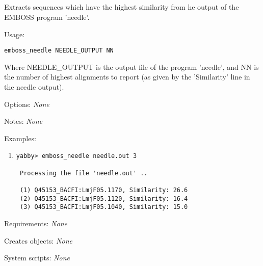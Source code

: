 
\subsection[emboss\_needle]{  }



Extracts sequences which have the highest similarity from
he output of the EMBOSS program 'needle'.


\begin{description}


\item{Usage:}

{\tt emboss\_needle NEEDLE\_OUTPUT NN}

  Where NEEDLE\_OUTPUT is the output file of the program 'needle',
  and NN is the number of highest alignments to report (as given
  by the 'Similarity' line in the needle output).


\item{Options:} {\em None}


\item{Notes:} {\em None}


\item{Examples:}
\begin{enumerate}

\item
\begin{verbatim}
yabby> emboss_needle needle.out 3

 Processing the file 'needle.out' ..

 (1) Q45153_BACFI:LmjF05.1170, Similarity: 26.6
 (2) Q45153_BACFI:LmjF05.1120, Similarity: 16.4
 (3) Q45153_BACFI:LmjF05.1040, Similarity: 15.0

\end{verbatim}

\end{enumerate}


\item{Requirements:} {\em None}


\item{Creates objects:} {\em None}


\item{System scripts:} {\em None}

\end{description}


